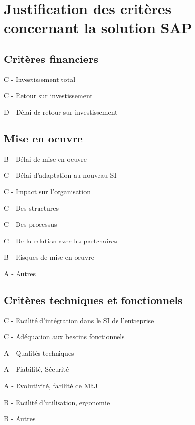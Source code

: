 \section{Justification des critères concernant la solution SAP}

\subsection{Critères financiers}

C - Investissement total

C - Retour sur investissement

D - Délai de retour sur investissement

\subsection{Mise en oeuvre}

B - Délai de mise en oeuvre

C - Délai d'adaptation au nouveau SI

C - Impact sur l'organisation

	C - Des structures

	C - Des processus

	C - De la relation avec les partenaires

B - Risques de mise en oeuvre

A - Autres

\subsection{Critères techniques et fonctionnels}

C - Facilité d'intégration dans le SI de l'entreprise

C - Adéquation aux besoins fonctionnels

A - Qualités techniques

	A - Fiabilité, Sécurité

	A - Evolutivité, facilité de MàJ

	B - Facilité d'utilisation, ergonomie

B - Autres
